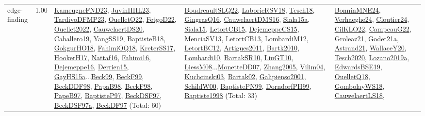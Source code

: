 {\begin{longtable}{p{3cm}r>{\raggedright\arraybackslash}p{6cm}>{\raggedright\arraybackslash}p{6cm}>{\raggedright\arraybackslash}p{8cm}}
\index{edge-finding}\index{Algorithms!edge-finding}edge-finding &  1.00 & \hyperref[detail:KameugneFND23]{KameugneFND23}, \hyperref[detail:JuvinHHL23]{JuvinHHL23}, \hyperref[detail:TardivoDFMP23]{TardivoDFMP23}, \hyperref[detail:OuelletQ22]{OuelletQ22}, \hyperref[detail:FetgoD22]{FetgoD22}, \hyperref[detail:Ouellet2022]{Ouellet2022}, \hyperref[detail:CauwelaertDS20]{CauwelaertDS20}, \hyperref[detail:Caballero19]{Caballero19}, \hyperref[detail:YangSS19]{YangSS19}, \hyperref[detail:BaptisteB18]{BaptisteB18}, \hyperref[detail:GokgurHO18]{GokgurHO18}, \hyperref[detail:FahimiOQ18]{FahimiOQ18}, \hyperref[detail:KreterSS17]{KreterSS17}, \hyperref[detail:HookerH17]{HookerH17}, \hyperref[detail:Nattaf16]{Nattaf16}, \hyperref[detail:Fahimi16]{Fahimi16}, \hyperref[detail:Dejemeppe16]{Dejemeppe16}, \hyperref[detail:Derrien15]{Derrien15}, \hyperref[detail:GayHS15a]{GayHS15a}...\hyperref[detail:Beck99]{Beck99}, \hyperref[detail:BeckF99]{BeckF99}, \hyperref[detail:BeckDDF98]{BeckDDF98}, \hyperref[detail:PapaB98]{PapaB98}, \hyperref[detail:BeckF98]{BeckF98}, \hyperref[detail:PapeB97]{PapeB97}, \hyperref[detail:BaptisteP97]{BaptisteP97}, \hyperref[detail:BeckDSF97]{BeckDSF97}, \hyperref[detail:BeckDSF97a]{BeckDSF97a}, \hyperref[detail:BeckDF97]{BeckDF97} (Total: 60) & \hyperref[detail:BoudreaultSLQ22]{BoudreaultSLQ22}, \hyperref[detail:LaborieRSV18]{LaborieRSV18}, \hyperref[detail:Tesch18]{Tesch18}, \hyperref[detail:GingrasQ16]{GingrasQ16}, \hyperref[detail:CauwelaertDMS16]{CauwelaertDMS16}, \hyperref[detail:Siala15a]{Siala15a}, \hyperref[detail:Siala15]{Siala15}, \hyperref[detail:LetortCB15]{LetortCB15}, \hyperref[detail:DejemeppeCS15]{DejemeppeCS15}, \hyperref[detail:MenciaSV13]{MenciaSV13}, \hyperref[detail:LetortCB13]{LetortCB13}, \hyperref[detail:LombardiM12]{LombardiM12}, \hyperref[detail:LetortBC12]{LetortBC12}, \hyperref[detail:Artigues2011]{Artigues2011}, \hyperref[detail:Bartk2010]{Bartk2010}, \hyperref[detail:Lombardi10]{Lombardi10}, \hyperref[detail:BartakSR10]{BartakSR10}, \hyperref[detail:LiuGT10]{LiuGT10}, \hyperref[detail:LiessM08]{LiessM08}...\hyperref[detail:MonetteDD07]{MonetteDD07}, \hyperref[detail:Zhang2005]{Zhang2005}, \hyperref[detail:Vilim04]{Vilim04}, \hyperref[detail:Kuchcinski03]{Kuchcinski03}, \hyperref[detail:Bartak02]{Bartak02}, \hyperref[detail:Galipienso2001]{Galipienso2001}, \hyperref[detail:SchildW00]{SchildW00}, \hyperref[detail:BaptistePN99]{BaptistePN99}, \hyperref[detail:DorndorfPH99]{DorndorfPH99}, \hyperref[detail:Baptiste1998]{Baptiste1998} (Total: 33) & \hyperref[detail:BonninMNE24]{BonninMNE24}, \hyperref[detail:Verhaeghe24]{Verhaeghe24}, \hyperref[detail:Cloutier24]{Cloutier24}, \hyperref[detail:CilKLO22]{CilKLO22}, \hyperref[detail:CampeauG22]{CampeauG22}, \hyperref[detail:Groleaz21]{Groleaz21}, \hyperref[detail:Godet21a]{Godet21a}, \hyperref[detail:Astrand21]{Astrand21}, \hyperref[detail:WallaceY20]{WallaceY20}, \hyperref[detail:Tesch2020]{Tesch2020}, \hyperref[detail:Lozano2019a]{Lozano2019a}, \hyperref[detail:EdwardsBSE19]{EdwardsBSE19}, \hyperref[detail:OuelletQ18]{OuelletQ18}, \hyperref[detail:GombolayWS18]{GombolayWS18}, \hyperref[detail:CauwelaertLS18]{CauwelaertLS18}, 
\end{longtable}}
